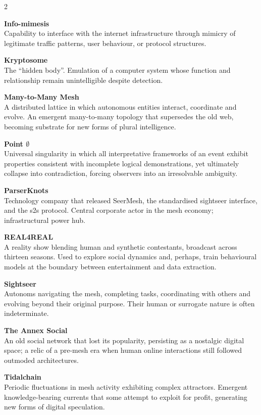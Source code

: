{\begin{multicols}{2}
\medskip

\noindent\textbf{Info-mimesis}\\
Capability to interface with the internet infrastructure through mimicry of legitimate traffic patterns, user behaviour, or protocol structures.

\medskip

\noindent\textbf{Kryptosome}\\
The ``hidden body''. Emulation of a computer system whose function and relationship remain unintelligible despite detection.

\medskip

\noindent\textbf{Many-to-Many Mesh}\\
A distributed lattice in which autonomous entities interact, coordinate and evolve. An emergent many-to-many topology that supersedes the old web, becoming substrate for new forms of plural intelligence.

\medskip

\noindent\textbf{Point $\emptyset$}\\
Universal singularity in which all interpretative frameworks of an event exhibit properties consistent with incomplete logical demonstrations, yet ultimately collapse into contradiction, forcing observers into an irresolvable ambiguity.

\medskip

\noindent\textbf{ParserKnots}\\
Technology company that released SeerMesh, the standardised sightseer interface, and the s2s protocol. Central corporate actor in the mesh economy; infrastructural power hub.

\medskip

\noindent\textbf{REAL4REAL}\\
A reality show blending human and synthetic contestants, broadcast across thirteen seasons. Used to explore social dynamics and, perhaps, train behavioural models at the boundary between entertainment and data extraction.

\medskip

\noindent\textbf{Sightseer}\\
Autonoms navigating the mesh, completing tasks, coordinating with others and evolving beyond their original purpose. Their human or surrogate nature is often indeterminate.

\medskip

\noindent\textbf{The Annex Social}\\
An old social network that lost its popularity, persisting as a nostalgic digital space; a relic of a pre-mesh era when human online interactions still followed outmoded architectures.

\medskip

\noindent\textbf{Tidalchain}\\
Periodic fluctuations in mesh activity exhibiting complex attractors. Emergent knowledge-bearing currents that some attempt to exploit for profit, generating new forms of digital speculation.

\end{multicols}
}


